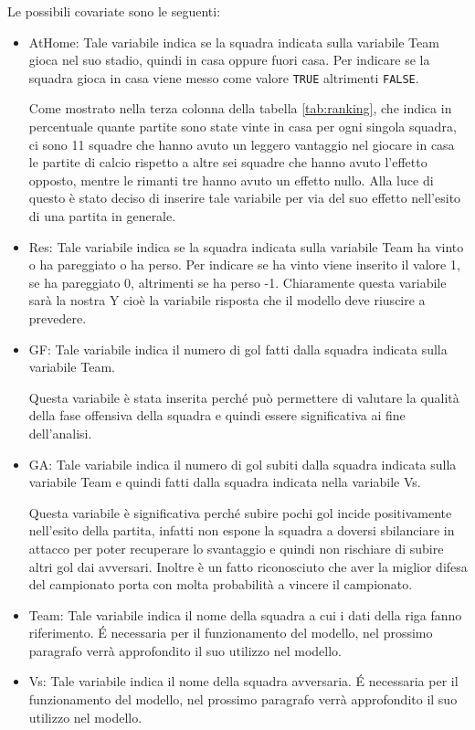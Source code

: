 Le possibili covariate sono le seguenti:
\begin{itemize}
	\item \textsf{AtHome}: Tale variabile indica se la squadra indicata sulla variabile \textsf{Team} gioca nel suo stadio, quindi in casa oppure fuori casa. Per indicare se la squadra gioca in casa viene messo come valore \texttt{TRUE} altrimenti \texttt{FALSE}. 
	
	Come mostrato nella terza colonna della tabella \ref{tab:ranking}, che indica in percentuale quante partite sono state vinte in casa per ogni singola squadra, ci sono 11 squadre che hanno avuto un leggero vantaggio nel giocare in casa le partite di calcio rispetto a altre sei squadre che hanno avuto l'effetto opposto, mentre le rimanti tre hanno avuto un effetto nullo. Alla luce di questo è stato deciso di inserire tale variabile per via del suo effetto nell'esito di una partita in generale.
	\item \textsf{Res}: Tale variabile indica se la squadra indicata sulla variabile \textsf{Team} ha vinto o ha pareggiato o ha perso. Per indicare se ha vinto viene inserito il valore 1, se ha pareggiato 0, altrimenti se ha perso -1. Chiaramente questa variabile sarà la nostra Y cioè la variabile risposta che il modello deve riuscire a prevedere.
	\item \textsf{GF}: Tale variabile indica il numero di gol fatti dalla squadra indicata sulla variabile \textsf{Team}. 
	
	Questa variabile è stata inserita perché può permettere di valutare la qualità della fase offensiva della squadra e quindi essere significativa ai fine dell'analisi.
	\item \textsf{GA}: Tale variabile indica il numero di gol subiti dalla squadra indicata sulla variabile \textsf{Team} e quindi fatti dalla squadra indicata nella variabile \textsf{Vs}. 
	
	Questa variabile è significativa perché subire pochi gol incide positivamente nell'esito della partita, infatti non espone la squadra a doversi sbilanciare in attacco per poter recuperare lo svantaggio e quindi non rischiare di subire altri gol dai avversari. Inoltre è un fatto riconosciuto che aver la miglior difesa del campionato porta con molta probabilità a vincere il campionato.
	\item \textsf{Team}: Tale variabile indica il nome della squadra a cui i dati della riga fanno riferimento. É necessaria per il funzionamento del modello, nel prossimo paragrafo verrà approfondito il suo utilizzo nel modello.
	\item \textsf{Vs}: Tale variabile indica il nome della squadra avversaria. É necessaria per il funzionamento del modello, nel prossimo paragrafo verrà approfondito il suo utilizzo nel modello.
	

\end{itemize}
